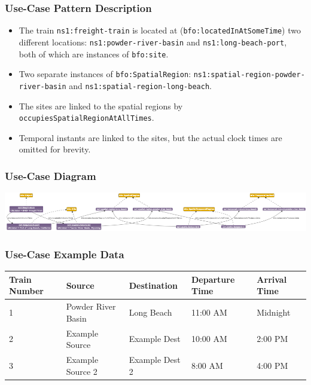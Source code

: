 \subsubsection*{Use-Case Pattern Description}

\begin{itemize}
    \item The train \texttt{ns1:freight-train} is located at (\texttt{bfo:locatedInAtSomeTime}) two different locations: \texttt{ns1:powder-river-basin} and \texttt{ns1:long-beach-port}, both of which are instances of \texttt{bfo:site}.
    \item Two separate instances of \texttt{bfo:SpatialRegion}: \texttt{ns1:spatial-region-powder-river-basin} and \texttt{ns1:spatial-region-long-beach}.
    \item The sites are linked to the spatial regions by \texttt{occupiesSpatialRegionAtAllTimes}.
    \item Temporal instants are linked to the sites, but the actual clock times are omitted for brevity.
\end{itemize}


\subsubsection*{Use-Case Diagram}
\includegraphics[scale=0.45]{scenarios/location-change/images/change-location-usecase1.png}

\subsubsection*{Use-Case Example Data}

\begin{tabularx}{\textwidth}{|X|l|X|X|X|}
\hline
Train Number & Source & Destination & Departure Time & Arrival Time \\
\hline
1            & Powder River Basin & Long Beach      & 11:00 AM      & Midnight       \\
2            & Example Source     & Example Dest    & 10:00 AM      & 2:00 PM        \\
3            & Example Source 2   & Example Dest 2  & 8:00 AM       & 4:00 PM        \\
\hline
\end{tabularx}

